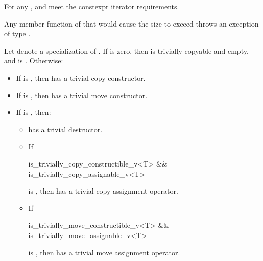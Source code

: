 \pnum
For any ,
 and
meet the constexpr iterator requirements.

\pnum
Any member function of  that
would cause the size to exceed 
throws an exception of type .

\pnum
Let  denote a specialization of .
If  is zero, then
 is trivially copyable and empty, and
 is .
Otherwise:
\begin{itemize}
\item
If  is , then
 has a trivial copy constructor.
\item
If  is , then
 has a trivial move constructor.
\item
If  is , then:
  \begin{itemize}
  \item
   has a trivial destructor.
  \item
  If
\begin{codeblock}
  is_trivially_copy_constructible_v<T> && is_trivially_copy_assignable_v<T>
\end{codeblock}
  is , then
   has a trivial copy assignment operator.
  \item
  If
\begin{codeblock}
  is_trivially_move_constructible_v<T> && is_trivially_move_assignable_v<T>
\end{codeblock}
  is , then
   has a trivial move assignment operator.
  \end{itemize}
\end{itemize}

